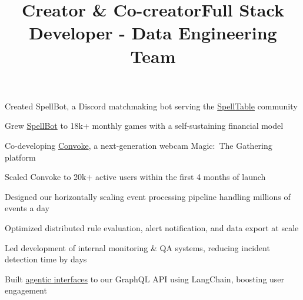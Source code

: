 \documentclass[12pt, line]{res}
\let\tempone\itemize
\let\temptwo\enditemize
\renewenvironment{itemize}{%
  \setlength{\topsep}{0pt}%
  \setlength{\partopsep}{0pt}%
  \tempone
  \renewcommand{\labelitemi}{$\bullet$}%
  \vspace{-0.25in}%
  \setlength{\itemsep}{3pt}%
  \setlength{\parsep}{0pt}%
}{%
  \temptwo
}
\begin{document}
\begin{resume}
  \title{Creator \& Co-creator}
  \begin{position}
    \begin{itemize}
      \item Created SpellBot, a Discord matchmaking bot serving the \href{https://spelltable.wizards.com/}{SpellTable} community
      \item Grew \href{https://spellbot.io}{SpellBot} to 18k+ monthly games with a self-sustaining financial model
      \item Co-developing \href{https://convoke.games/}{Convoke}, a next-generation webcam Magic:~The Gathering platform
      \item Scaled Convoke to 20k+ active users within the first 4 months of launch
    \end{itemize}
  \end{position}

  \title{Full Stack Developer - Data Engineering Team}
  \begin{position}
    \begin{itemize}
      \item Designed our horizontally scaling event processing pipeline handling millions of events a day
      \item Optimized distributed rule evaluation, alert notification, and data export at scale
      \item Led development of internal monitoring \& QA systems, reducing incident detection time by days
      \item Built \href{https://www.montecarlodata.com/platform/operations-agent}{agentic interfaces} to our GraphQL API using LangChain, boosting user engagement
    \end{itemize}
  \end{position}


\end{resume}
\end{document}
